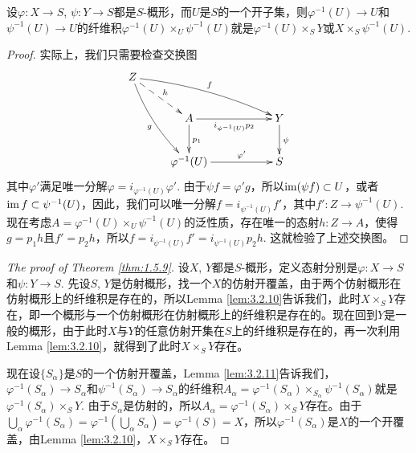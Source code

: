 \begin{lem}\label{lem:3.2.11}
设$\varphi:X\to S$, $\psi:Y\to S$都是$S$-概形，而$U$是$S$的一个开子集，则$\varphi^{-1}(U)\to U$和$\psi^{-1}(U)\to U$的纤维积$\varphi^{-1}(U)\times_U \psi^{-1}(U)$就是$\varphi^{-1}(U)\times_S Y$或$X\times_S \psi^{-1}(U)$.
\end{lem}

\begin{proof}
实际上，我们只需要检查交换图
\[
\begin{xy}
	\xymatrix{
		Z\ar@/_/[rdd]_{g}\ar@/^/[drrr]^{f}\ar@{-->}[dr]^h&&&\\
		&A\ar[rr]_-{i_{\psi^{-1}(U)}p_2}\ar[d]^{p_1}&&Y\ar[d]^\psi\\
		&\varphi^{-1}(U)\ar[rr]^-{\varphi'}&&S
	}
\end{xy}
\]
其中$\varphi'$满足唯一分解$\varphi=i_{\varphi^{-1}(U)}\varphi'$. 由于$\psi f=\varphi' g$，所以$\operatorname{im}(\psi f)\subset U$，或者$\operatorname{im} f\subset \psi^{-1}(U)$，因此，我们可以唯一分解$f=i_{\psi^{-1}(U)}f'$，其中$f':Z\to \psi^{-1}(U)$. 现在考虑$A=\varphi^{-1}(U)\times_{U}\psi^{-1}(U)$的泛性质，存在唯一的态射$h:Z\to A$，使得$g=p_1h$且$f'=p_2h$，所以$f=i_{\psi^{-1}(U)}f'=i_{\psi^{-1}(U)}p_2h$. 这就检验了上述交换图。
\end{proof}

\begin{proof}[The proof of Theorem \ref{thm:1.5.9}]
设$X$, $Y$都是$S$-概形，定义态射分别是$\varphi:X\to S$和$\psi:Y\to S$. 先设$S$, $Y$是仿射概形，找一个$X$的仿射开覆盖，由于两个仿射概形在仿射概形上的纤维积是存在的，所以Lemma \ref{lem:3.2.10}告诉我们，此时$X\times_S Y$存在，即一个概形与一个仿射概形在仿射概形上的纤维积是存在的。现在回到$Y$是一般的概形，由于此时$X$与$Y$的任意仿射开集在$S$上的纤维积是存在的，再一次利用Lemma \ref{lem:3.2.10}，就得到了此时$X\times_S Y$存在。

现在设$\{S_\alpha\}$是$S$的一个仿射开覆盖，Lemma \ref{lem:3.2.11}告诉我们，$\varphi^{-1}(S_\alpha)\to S_\alpha$和$\psi^{-1}(S_\alpha)\to S_\alpha$的纤维积$A_\alpha=\varphi^{-1}(S_\alpha)\times_{S_\alpha}\psi^{-1}(S_\alpha)$就是$\varphi^{-1}(S_\alpha)\times_S Y$. 由于$S_\alpha$是仿射的，所以$A_\alpha=\varphi^{-1}(S_\alpha)\times_S Y$存在。由于$\bigcup_\alpha\varphi^{-1}(S_\alpha)=\varphi^{-1}\left(\bigcup_\alpha S_\alpha\right)=\varphi^{-1}(S)=X$，所以$\varphi^{-1}(S_\alpha)$是$X$的一个开覆盖，由Lemma \ref{lem:3.2.10}，$X\times_S Y$存在。
\end{proof}


